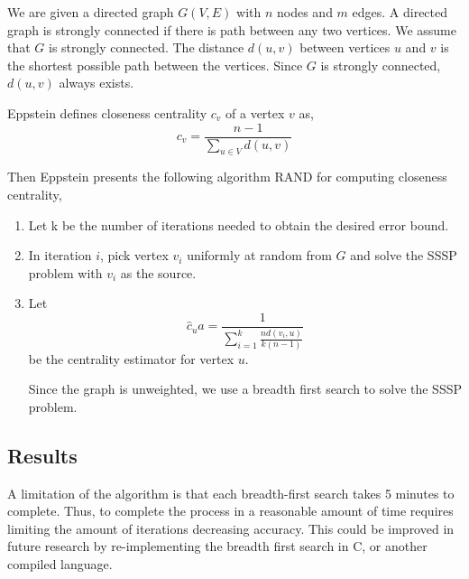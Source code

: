 \documentclass{article}
\begin{document}
We are given a directed graph $G(V,E)$ with $n$ nodes and $m$ edges.
A directed graph is strongly connected if there is path between any two vertices. We assume that $G$ is strongly connected.
The distance $d(u, v)$ between vertices $u$ and $v$ is the shortest possible path between the vertices. Since $G$ is strongly connected, $d(u, v)$ always exists.


Eppstein defines closeness centrality $c_v$ of a vertex $v$ as,
\begin{equation*}
    c_v = \frac{n-1}{\sum_{u \in V}d(u,v)}
\end{equation*} 

Then Eppstein presents the following algorithm RAND for computing closeness centrality,
\begin{enumerate}[1.]
    \item 
    Let k be the number of iterations needed to obtain the desired error bound.

    \item
    In iteration $i$, pick vertex $v_i$ uniformly at random from $G$ and solve the SSSP problem with $v_i$ as the source.

    \item 
    Let
    \begin{equation*}
        \hat{c}_ua = \frac{1}{\sum^k_{i=1} \frac{n d(v_i, u)}{k(n-1)}}
    \end{equation*}
    be the centrality estimator for vertex $u$.

    Since the graph is unweighted, we use a breadth first search to solve the SSSP problem.

    
\end{enumerate}

\subsection*{Results}

A limitation of the algorithm is that each breadth-first search takes 5 minutes to complete. Thus, to complete the process in a reasonable amount of time requires limiting the amount of iterations decreasing accuracy. This could be improved in future research by re-implementing the breadth first search in C, or another compiled language.
\end{document}
